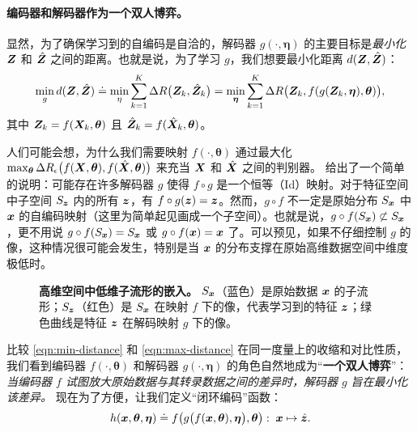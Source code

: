 \documentclass[../../book-main.tex]{subfiles}
\begin{document}
\paragraph{编码器和解码器作为一个双人博弈。}
显然，为了确保学习到的自编码是自洽的，解码器 $g(\cdot, \bm \eta)$ 的主要目标是{\em 最小化} $\bm{Z}$ 和 $\hat {\bm{Z}}$ 之间的距离。也就是说，为了学习 $g$，我们想要最小化距离 $d(\bm{Z}, \hat {\bm{Z}})$：
\begin{equation}
\min_g d(\bm{Z}, \hat {\bm{Z}}) \doteq \min_\eta  \sum_{k=1}^K \Delta R\big(\bm{Z}_k, \hat{\bm{Z}}_k\big) =  \min_{\bm \eta}  \sum_{k=1}^K \Delta R\big(\bm{Z}_k, f(g(\bm{Z}_k, \bm \eta),\bm \theta)\big),
\label{eqn:min-distance}
\end{equation}
其中 $\bm{Z}_k = f(\bm{X}_k,\bm \theta)$ 且 $\hat {\bm{Z}}_k = f(\hat{\bm{X}}_k,\bm\theta)$。

\begin{example}
人们可能会想，为什么我们需要映射 $f(\cdot, \bm \theta)$ 通过最大化 $\max_{\bm \theta} \Delta R_\epsilon\big(f(\bm{X},\bm \theta), f(\hat {\bm{X}}, \bm \theta)\big)$ 来充当 $\bm{X}$ 和 $\hat {\bm{X}}$ 之间的判别器。  给出了一个简单的说明：可能存在许多解码器 $g$ 使得 $f\circ g$ 是一个恒等（Id）映射。对于特征空间中子空间 $S_{\bm{z}}$ 内的所有 $\bm{z}$，有 $f\circ g(\bm{z}) = \bm{z}$。然而，$g\circ f$ 不一定是原始分布 $S_{\bm{x}}$ 中 $\bm{x}$ 的自编码映射（这里为简单起见画成一个子空间）。也就是说，$g\circ f(S_{\bm{x}}) \not\subset S_{\bm{x}}$，更不用说 $g\circ f(S_{\bm{x}}) = S_{\bm{x}}$ 或 $g\circ f(\bm{x}) = \bm{x}$ 了。可以预见，如果不仔细控制 $g$ 的像，这种情况很可能会发生，特别是当 $\bm{x}$ 的分布支撑在原始高维数据空间中维度极低时。
\end{example}
\begin{figure}
\caption{\textbf{高维空间中低维子流形的嵌入。} $S_{\bm{x}}$（蓝色）是原始数据 $\bm{x}$ 的子流形；$S_{\bm{z}}$（红色）是 $S_{\bm{x}}$ 在映射 $f$ 下的像，代表学习到的特征 $\bm{z}$；绿色曲线是特征 $\bm{z}$ 在解码映射 $g$ 下的像。} \label{fig:decoder}
\end{figure} 

比较 \eqref{eqn:min-distance} 和 \eqref{eqn:max-distance} 在同一度量上的收缩和对比性质，我们看到编码器 $f(\cdot, \bm \theta)$ 和解码器 $g(\cdot, \bm \eta)$ 的角色自然地成为“{\bf 一个双人博弈}”：{\em 当编码器 $f$ 试图放大原始数据与其转录数据之间的差异时，解码器 $g$ 旨在最小化该差异。} 现在为了方便，让我们定义“闭环编码”函数：
\begin{equation}
    h(\bm{x}, \bm \theta,\bm \eta) \doteq f\big(g\big(f(\bm{x}, \bm \theta), \bm \eta\big), \bm \theta\big): \; \bm{x} \mapsto \hat {\bm{z}}.
\end{equation}
\end{document}
